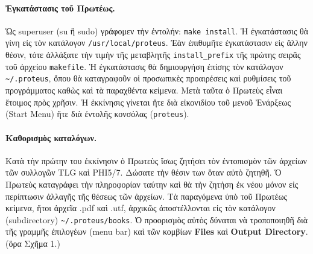 \documentclass[12pt,a4paper]{article}
\begin{document}
    \paragraph{Ἐγκατάστασις τοῦ Πρωτέως.}
      Ὡς superuser (su ἢ sudo) γράφομεν τὴν ἐντολήν: {\tt make install}.
      Ἡ ἐγκατάστασις θὰ γίνη εἰς τὸν κατάλογον
      {\tt /usr/local/proteus}.
      Ἐὰν ἐπιθυμῆτε ἐγκατάστασιν εἰς ἄλλην θέσιν, τότε ἀλλάξατε τὴν τιμὴν
      τῆς μεταβλητῆς {\tt install\_prefix} τῆς πρώτης σειρᾶς τοῦ ἀρχείου
      {\tt makefile}. Ἡ ἐγκατάστασις θὰ δημιουργήση ἐπίσης τὸν κατάλογον
      {\tt \~{}/.proteus}, ὅπου θὰ καταγραφοῦν οἱ προσωπικὲς προαιρέσεις καὶ
      ρυθμίσεις τοῦ προγράμματος καθὼς καὶ τὰ παραχθέντα κείμενα. Μετὰ
      ταῦτα ὁ Πρωτεὺς εἶναι ἕτοιμος πρὸς χρῆσιν. Ἡ ἐκκίνησις γίνεται
      ἤτε διὰ εἰκονιδίου τοῦ μενοῦ Ἐνάρξεως (Start Menu) ἤτε διὰ ἐντολῆς
      κονσόλας ({\tt proteus}).

    \paragraph{Καθορισμὸς καταλόγων.}
      Κατὰ τὴν πρώτην του ἐκκίνησιν ὁ Πρωτεὺς ἴσως ζητήσει τὸν ἐντοπισμὸν
      τῶν ἀρχείων τῶν συλλογῶν TLG καὶ PHI5/7.  Δώσατε τὴν θέσιν των
      ὅταν αὐτὸ ζητηθῆ.  Ὁ Πρωτεὺς καταγράφει τὴν πληροφορίαν
      ταύτην καὶ θὰ τὴν ζητήση ἐκ νέου μόνον εἰς περίπτωσιν
      ἀλλαγῆς τῆς θέσεως τῶν ἀρχείων.  Τὰ παραγόμενα ὑπὸ τοῦ Πρωτέως κείμενα, ἤτοι
      ἀρχεῖα .pdf καὶ .utf, ἀρχικῶς ἀποστέλλονται εἰς τὸν κατάλογον (subdirectory)
      {\tt \~{}/.proteus/books}. Ὁ προορισμὸς αὐτὸς δύναται νὰ τροποποιηθῆ
      διὰ τῆς γραμμῆς ἐπιλογέων (menu bar) καὶ τῶν κομβίων
      {\bf Files} καὶ {\bf Output Directory}. (ὅρα Σχῆμα 1.)
\end{document}
